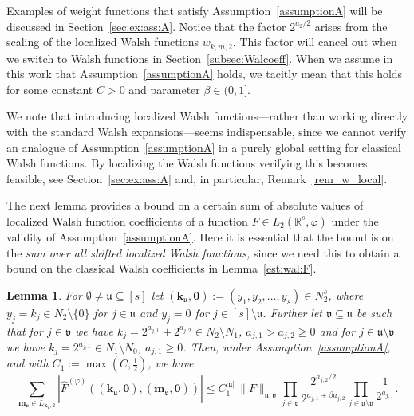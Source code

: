 \documentclass[namedate,webpdf,imanum]{ima-authoring-arxiv}%
\theoremstyle{thmstyletwo}%
\newtheorem{lemma}{Lemma}
\numberwithin{equation}{section}
\newcommand{\bsk}{\boldsymbol{k}}
\newcommand{\bsm}{\boldsymbol{m}}
\newcommand{\bszero}{\boldsymbol{0}}
\newcommand{\uu}{\mathfrak{u}}
\newcommand{\vv}{\mathfrak{v}}
\begin{document}
Examples of weight functions that satisfy Assumption~\ref{assumptionA} will be discussed in Section~\ref{sec:ex:ass:A}. Notice that the factor $2^{a_2/2}$ arises from the scaling of the localized Walsh functions $w_{k,m,2}$. This factor will cancel out when we switch to Walsh functions in Section~\ref{subsec:Walcoeff}. When we assume in this work that Assumption~\ref{assumptionA} holds, we tacitly mean that this holds for some constant $C>0$ and parameter $\beta \in (0,1]$.

We note that introducing localized Walsh functions—rather than working directly with the standard Walsh expansions—seems indispensable, since we cannot verify an analogue of Assumption~\ref{assumptionA} in a purely global setting for classical Walsh functions.  By localizing the Walsh functions verifying this becomes feasible, see Section~\ref{sec:ex:ass:A} and, in particular, Remark~\ref{rem_w_local}.


The next lemma provides a bound on a certain sum of absolute values of localized Walsh function coefficients of a function $F \in L_2(\mathbb{R}^s,\varphi)$ under the validity of Assumption~\ref{assumptionA}. Here it is essential that the bound is on the \textit{sum over all shifted localized Walsh functions,} since we need this to obtain a bound on the classical Walsh coefficients in Lemma~\ref{est:wal:F}.

\begin{lemma}\label{le:hatF2}
For $\emptyset \not= \uu \subseteq [s]$ let $(\bsk_\uu,\bszero) :=(y_1,y_2,\ldots,y_s) \in N_2^s$, where $y_j=k_j \in N_2 \setminus \{0\}$ for $j \in \uu$ and $y_j=0$ for $j \in [s] \setminus \uu$. Further let $\vv \subseteq \uu$ be such that for $j \in \vv$ we have $k_j =2^{a_{j,1}}+2^{a_{j,2}} \in N_2 \setminus N_1$, $a_{j,1} > a_{j,2} \ge 0$ and for $j \in \uu \setminus \vv$ we have $k_j =2^{a_{j,1}}\in N_1 \setminus N_0$, $a_{j,1}\ge 0$. Then, under Assumption~\ref{assumptionA}, and with $C_1:=\max(C,\tfrac{1}{2})$, we have 
\begin{equation*}
\sum_{\bsm_{\vv} \in L_{\bsk_{\vv}, 2}} | \widehat{F}^{(\varphi)}((\bsk_\uu,\bszero),(\bsm_\vv,\bszero))| \le C_1^{|\uu|} \, \|F\|_{\uu, \vv}  \prod_{j \in \vv} \frac{2^{a_{j,2}/2}}{2^{a_{j,1}+ \beta a_{j,2}}}  \prod_{j \in \uu \setminus \vv} \frac{1}{2^{a_{j,1}}} .
\end{equation*}
\end{lemma}
\end{document}
